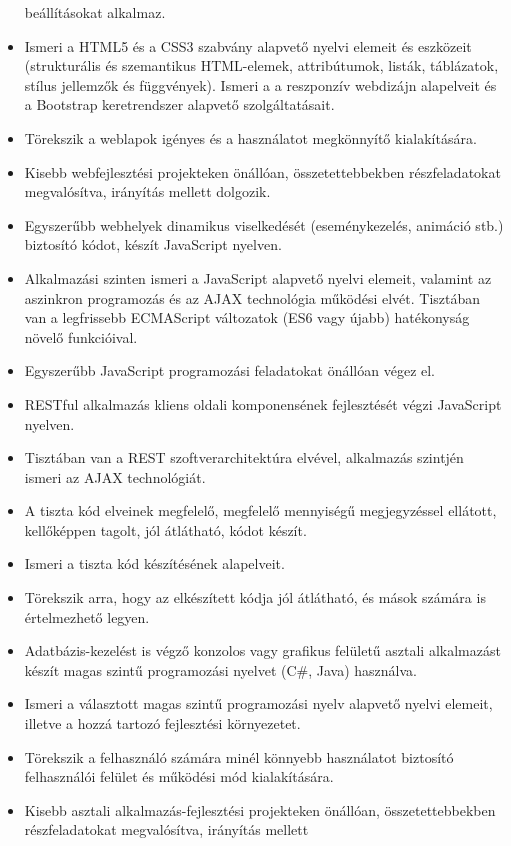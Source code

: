 \begin{itemize}
  beállításokat alkalmaz.
\item
  Ismeri a HTML5 és a CSS3 szabvány alapvető nyelvi elemeit és eszközeit
  (strukturális és szemantikus HTML-elemek, attribútumok, listák,
  táblázatok, stílus jellemzők és függvények). Ismeri a a reszponzív
  webdizájn alapelveit és a Bootstrap keretrendszer alapvető
  szolgáltatásait.
\item
  Törekszik a weblapok igényes és a használatot megkönnyítő
  kialakítására.
\item
  Kisebb webfejlesztési projekteken önállóan, összetettebbekben
  részfeladatokat megvalósítva, irányítás mellett dolgozik.
\item
  Egyszerűbb webhelyek dinamikus viselkedését (eseménykezelés, animáció
  stb.) biztosító kódot, készít JavaScript nyelven.
\item
  Alkalmazási szinten ismeri a JavaScript alapvető nyelvi elemeit,
  valamint az aszinkron programozás és az AJAX technológia működési
  elvét. Tisztában van a legfrissebb ECMAScript változatok (ES6 vagy
  újabb) hatékonyság növelő funkcióival.
\item
  Egyszerűbb JavaScript programozási feladatokat önállóan végez el.
\item
  RESTful alkalmazás kliens oldali komponensének fejlesztését végzi
  JavaScript nyelven.
\item
  Tisztában van a REST szoftverarchitektúra elvével, alkalmazás szintjén
  ismeri az AJAX technológiát.
\item
  A tiszta kód elveinek megfelelő, megfelelő mennyiségű megjegyzéssel
  ellátott, kellőképpen tagolt, jól átlátható, kódot készít.
\item
  Ismeri a tiszta kód készítésének alapelveit.
\item
  Törekszik arra, hogy az elkészített kódja jól átlátható, és mások
  számára is értelmezhető legyen.
\item
  Adatbázis-kezelést is végző konzolos vagy grafikus felületű asztali
  alkalmazást készít magas szintű programozási nyelvet (C\#, Java)
  használva.
\item
  Ismeri a választott magas szintű programozási nyelv alapvető nyelvi
  elemeit, illetve a hozzá tartozó fejlesztési környezetet.
\item
  Törekszik a felhasználó számára minél könnyebb használatot biztosító
  felhasználói felület és működési mód kialakítására.
\item
  Kisebb asztali alkalmazás-fejlesztési projekteken önállóan,
  összetettebbekben részfeladatokat megvalósítva, irányítás mellett

\end{itemize}
